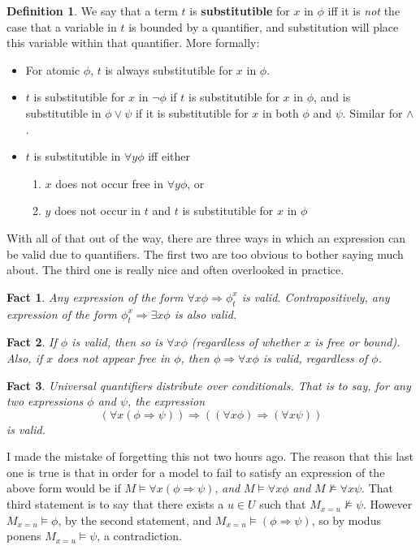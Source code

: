 \documentclass{article}
\theoremstyle{definition}
\newtheorem{definition}{Definition}[section]
\theoremstyle{plain}
\theoremstyle{theorem}
\newtheorem{fact}{Fact}[section]
\begin{document}
\begin{definition}
    We say that a term $t$ is \textbf{substitutible} for $x$ in $\phi$ iff it is \textit{not} the case that a variable in $t$ is bounded by a quantifier, and substitution will place this variable within that quantifier. More formally: 
    \begin{itemize}
        \item For atomic $\phi$, $t$ is always substitutible for $x$ in $\phi$.
        \item $t$ is substitutible for $x$ in $\neg \phi$ if $t$ is substitutible for $x$ in $\phi$, and is substitutible in $\phi \vee \psi$ if it is substitutible for $x$ in both $\phi$ and $\psi$. Similar for $\wedge$.
        \item $t$ is substitutible in $\forall y \phi$ iff either
        \begin{enumerate}
            \item $x$ does not occur free in $\forall y \phi$, or
            \item $y$ does not occur in $t$ and $t$ is substitutible for $x$ in $\phi$
        \end{enumerate}
    \end{itemize}
\end{definition}
\par With all of that out of the way, there are three ways in which an expression can be valid due to quantifiers. The first two are too obvious to bother saying much about. The third one is really nice and often overlooked in practice.
\begin{fact}
    Any expression of the form $\forall x \phi \Rightarrow \phi_t^x$ is valid. Contrapositively, any expression of the form $\phi_t^x \Rightarrow \exists x \phi$ is also valid.
\end{fact}
\begin{fact}
    If $\phi$ is valid, then so is $\forall x \phi$ (regardless of whether $x$ is free or bound). Also, if $x$ does not appear free in $\phi$, then $\phi \Rightarrow \forall x \phi$ is valid, regardless of $\phi$.
\end{fact}
\begin{fact}
    Universal quantifiers distribute over conditionals. That is to say, for any two expressions $\phi$ and $\psi$, the expression \[ (\forall x (\phi \Rightarrow \psi)) \Rightarrow ((\forall x \phi) \Rightarrow (\forall x \psi)) \]
    is valid.
\end{fact}
I made the mistake of forgetting this not two hours ago. The reason that this last one is true is that in order for a model to fail to satisfy an expression of the above form would be if $M \models \forall x(\phi \Rightarrow \psi)$, \textit{and} $M \models \forall x \phi$ \textit{and} $M \nvDash \forall x \psi$. That third statement is to say that there exists a $u \in U$ such that $M_{x = u} \nvDash \psi$. However $M_{x=u} \models \phi$, by the second statement, and $M_{x=u} \models (\phi \Rightarrow \psi)$, so by modus ponens $M_{x=u} \models \psi$, a contradiction.
\end{document}
